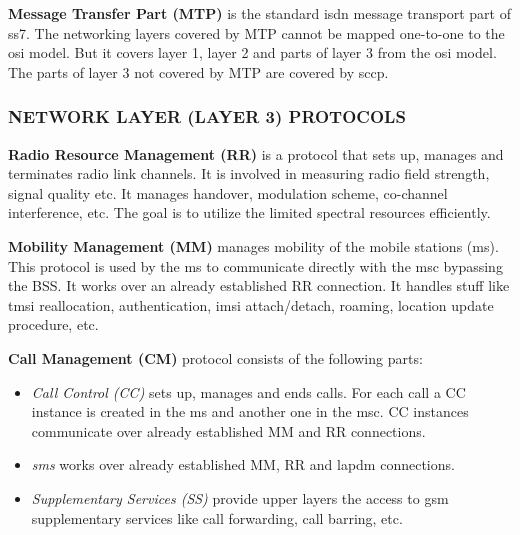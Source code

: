  
 \textbf{Message Transfer Part (MTP)} is the standard \gls{isdn} message transport 
 part of \gls{ss7}. The networking layers covered by MTP cannot
 be mapped
 one-to-one to the \gls{osi} model. But it covers layer 1, layer 2 and parts of layer 3 from the \gls{osi} 
 model. The parts of layer 3
 not covered by MTP are covered by \gls{sccp}.

\subsubsection{\uppercase{Network Layer (Layer 3) protocols}}

\textbf{Radio Resource Management (RR)} is a protocol that sets up, manages 
and terminates
 radio link channels. It is involved in measuring radio field strength, 
 signal quality etc.
 It manages handover, modulation scheme, co-channel interference, etc. The 
 goal is to 
 utilize the limited spectral resources efficiently.
 

\textbf{Mobility Management (MM)} manages mobility of the mobile stations 
(\gls{ms}). This protocol is used by the \gls{ms} to communicate directly with the \gls{msc} 
bypassing the BSS. It works over an already established
 RR connection. It handles stuff like \gls{tmsi} reallocation, authentication, 
 \gls{imsi} attach/detach, roaming, location update procedure, etc.
 
 
 \textbf{Call Management (CM)} protocol consists of the following parts:
 \begin{itemize}[noitemsep,topsep=0pt,parsep=0pt,partopsep=0pt]
  \item \textit{Call Control (CC)} sets up, manages and ends calls. For each 
  call a CC instance is created in the \gls{ms} and another one in the \gls{msc}. CC 
  instances 
  communicate over already established MM and RR connections.
  \item \textit{\gls{sms}} works over already established 
  MM, RR and \gls{lapdm} connections.
  \item \textit{Supplementary Services (SS)} provide upper layers the access 
  to \gls{gsm} supplementary services like call forwarding, call barring, etc. 
 \end{itemize}
